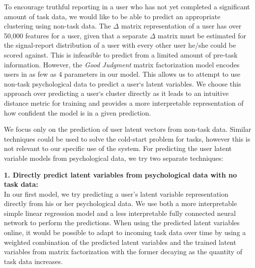 \documentclass{article}
\begin{document}
           
To encourage truthful reporting in a user who has not yet completed a significant amount of task data, we would like to be able to predict an appropriate clustering using non-task data. The $\Delta$ matrix representation of a user has over 50,000 features for a user, given that a separate $\Delta$ matrix must be estimated for the signal-report distribution of a user with every other user he/she could be scored against. This is infeasible to predict from a limited amount of pre-task information. However, the \emph{Good Judgment} matrix factorization model encodes users in as few as 4 parameters in our model. This allows us to attempt to use non-task psychological data to predict a user`s latent variables. We choose this approach over predicting a user`s cluster directly as it leads to an intuitive distance metric for training and provides a more interpretable representation of how confident the model is in a given prediction.

We focus only on the prediction of user latent vectors from non-task data. Similar techniques could be used to solve the cold-start problem for tasks, however this is not relevant to our specific use of the system. For predicting the user latent variable models from psychological data, we try two separate techniques: 

\noindent\textbf{1. Directly predict latent variables from psychological data with no task data: } \\
In our first model, we try predicting a user's latent variable representation directly from his or her psychological data. We use both a more interpretable simple linear regression model and a less interpretable fully connected neural network to perform the predictions. When using the predicted latent variables online, it would be possible to adapt to incoming task data over time by using a weighted combination of the predicted latent variables and the trained latent variables from matrix factorization with the former decaying as the quantity of task data increases. 
\end{document}
